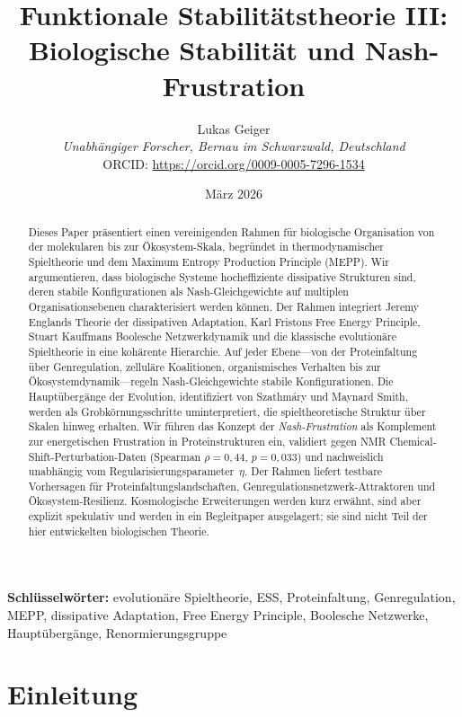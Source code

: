 \documentclass[12pt,a4paper]{article}
\title{Funktionale Stabilit\"atstheorie III: Biologische Stabilit\"at und Nash-Frustration}
\author{Lukas Geiger\\
\textit{Unabh\"angiger Forscher, Bernau im Schwarzwald, Deutschland}\\
ORCID: \url{https://orcid.org/0009-0005-7296-1534}}
\date{M\"arz 2026}
\theoremstyle{remark}
\begin{document}
\maketitle

\begin{abstract}
Dieses Paper pr\"asentiert einen vereinigenden Rahmen f\"ur biologische Organisation von der molekularen bis zur \"Okosystem-Skala, begr\"undet in thermodynamischer Spieltheorie und dem Maximum Entropy Production Principle (MEPP). Wir argumentieren, dass biologische Systeme hocheffiziente dissipative Strukturen sind, deren stabile Konfigurationen als Nash-Gleichgewichte auf multiplen Organisationsebenen charakterisiert werden k\"onnen. Der Rahmen integriert Jeremy Englands Theorie der dissipativen Adaptation, Karl Fristons Free Energy Principle, Stuart Kauffmans Boolesche Netzwerkdynamik und die klassische evolution\"are Spieltheorie in eine koh\"arente Hierarchie. Auf jeder Ebene---von der Proteinfaltung \"uber Genregulation, zellul\"are Koalitionen, organismisches Verhalten bis zur \"Okosystemdynamik---regeln Nash-Gleichgewichte stabile Konfigurationen. Die Haupt\"uberg\"ange der Evolution, identifiziert von Szathm\'ary und Maynard Smith, werden als Grobk\"ornungsschritte uminterpretiert, die spieltheoretische Struktur \"uber Skalen hinweg erhalten. Wir f\"uhren das Konzept der \emph{Nash-Frustration} als Komplement zur energetischen Frustration in Proteinstrukturen ein, validiert gegen NMR Chemical-Shift-Perturbation-Daten (Spearman $\rho = 0{,}44$, $p = 0{,}033$) und nachweislich unabh\"angig vom Regularisierungsparameter~$\eta$. Der Rahmen liefert testbare Vorhersagen f\"ur Proteinfaltungslandschaften, Genregulationsnetzwerk-Attraktoren und \"Okosystem-Resilienz. Kosmologische Erweiterungen werden kurz erw\"ahnt, sind aber explizit spekulativ und werden in ein Begleitpaper ausgelagert; sie sind nicht Teil der hier entwickelten biologischen Theorie.
\end{abstract}

\textbf{Schl\"usselw\"orter:} evolution\"are Spieltheorie, ESS, Proteinfaltung, Genregulation, MEPP, dissipative Adaptation, Free Energy Principle, Boolesche Netzwerke, Haupt\"uberg\"ange, Renormierungsgruppe

\section{Einleitung}
\label{sec:introduction}
\end{document}
